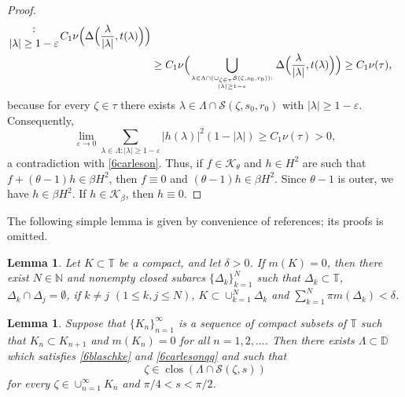 \documentclass[a4paper,oneside,11pt]{amsart}
\numberwithin{equation}{section}
\theoremstyle{plain}
\newtheorem{lemma}[theorem]{Lemma}
\theoremstyle{definition}
\begin{document}
\begin{proof}
\begin{align*}
{:\atop |\lambda|\geq 1-\varepsilon} C_1\nu\Bigl(\Delta\Bigl(\frac{\lambda}{|\lambda|},t(\lambda)\Bigr)\Bigr)\\&
\geq C_1 \nu\Bigl(\bigcup_{\lambda\in\Lambda\cap(\cup_{\zeta\in\tau}\mathcal S(\zeta,s_0,r_0))
:\atop |\lambda|\geq 1-\varepsilon}\Delta\Bigl(\frac{\lambda}{|\lambda|},t(\lambda)\Bigr)\Bigr)
\geq C_1 \nu(\tau),
\end{align*} 
because for every $\zeta\in\tau$  there exists $\lambda\in \Lambda\cap\mathcal S(\zeta,s_0,r_0)$ with $|\lambda|\geq 1-\varepsilon$. 
Consequently, 
\begin{equation*} \lim_{\varepsilon\to 0}\sum_{\lambda\in\Lambda: |\lambda|\geq 1-\varepsilon}
|h(\lambda)|^2(1-|\lambda|)\geq C_1 \nu(\tau)>0,
\end{equation*}
a contradiction with \eqref{6carleson}. Thus, if $f\in\mathcal K_\theta$ and $h\in H^2$ are such that $f+(\theta-1)h\in\beta H^2$, then  
$f\equiv 0$ and $(\theta-1)h\in\beta H^2$. Since $\theta-1$ is outer, we have $h\in\beta H^2$. If $h\in\mathcal K_\beta$, then $h\equiv 0$.
\end{proof}

The following simple lemma is given by convenience of references; its proofs is omitted.

\begin{lemma}\label{lemkk} Let $K\subset \mathbb T$ be a  compact, and let $\delta>0$. 
 If $m(K)=0$, then there exist $N\in\mathbb N$
 and nonempty closed subarcs 
 $\{\Delta_k\}_{k=1}^N$ such that $\Delta_k\subset\mathbb T$, $\Delta_k\cap\Delta_j=\emptyset$, if $k\neq j$ $(1\leq k,j\leq N)$, $K\subset\cup_{k=1}^N\Delta_k$  and $\sum_{k=1}^N\pi m(\Delta_k)<\delta$. 
\end{lemma}



\begin{lemma} \label{lemcarlesonkk}
 Suppose that $\{K_n\}_{n=1}^\infty$ is a sequence of compact subsets of $\mathbb T$ 
such that $K_n\subset K_{n+1}$ and 
$m(K_n)=0$ for all $n=1,2, \ldots$. Then there exists $\Lambda\subset\mathbb D$  which satisfies \eqref{6blaschke} and  \eqref{6carlesonqq}  and
 such that
\begin{equation} \label{nontang} \zeta\in\operatorname{clos}(\Lambda\cap\mathcal S(\zeta,s))\end{equation} 
 for every $\zeta\in\cup_{n=1}^\infty K_n$ and $\pi/4<s<\pi/2$.
\end{lemma}
\end{document}
